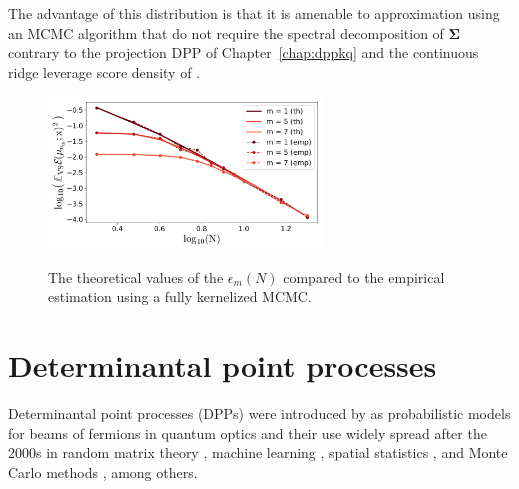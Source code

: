 \documentclass[twoside,11pt]{book}
\numberwithin{theorem}{chapter}
\numberwithin{definition}{chapter}
\numberwithin{proposition}{chapter}
\numberwithin{corollary}{chapter}
\numberwithin{example}{chapter}
\numberwithin{lemma}{chapter}
\numberwithin{assumption}{chapter}
\numberwithin{equation}{chapter}
\numberwithin{figure}{chapter}
\begin{document}
The advantage of this distribution is that it is amenable to approximation using an MCMC algorithm that do not require the spectral decomposition of $\bm{\Sigma}$ contrary to the projection DPP of Chapter~\ref{chap:dppkq} and the continuous ridge leverage score density of \citep{Bac17}.




\begin{figure}
\centering
\includegraphics[width=0.65\textwidth]{img/introduction/EX_VS_err_n_s_2_th_vs_emp_exp50.pdf}\\
\caption{ The theoretical values of the $\epsilon_{m}(N)$ compared to the empirical estimation using a fully kernelized MCMC. 
\label{fig:introduction_VS_th_vs_exp}}
\end{figure}


\clearpage
\chapter{Determinantal point processes}\label{chapter:dpp}

Determinantal point processes (DPPs) were introduced by \cite{Mac75} as probabilistic models for beams of fermions in quantum optics and their use widely spread after the 2000s in random matrix theory \citep{Joh05}, machine learning \citep{KuTa12}, spatial statistics \citep{LaMoRu15}, and Monte Carlo methods \citep{BaHa16}, among others.
\end{document}
